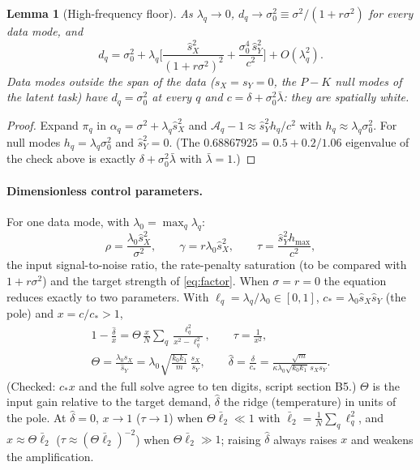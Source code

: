 \documentclass[11pt,a4paper]{article}
\newcommand{\sX}{\hat s_X^2}
\newcommand{\sY}{\hat s_Y^2}
\newcommand{\amp}{\mathcal A}
\newtheorem{lemma}{Lemma}
\theoremstyle{remark}
\begin{document}
\begin{lemma}[High-frequency floor]\label{lem:floor}
As $\lambda_q\to0$, $d_q \to \sigma_0^2 \equiv \sigma^2/(1+r\sigma^2)$ for every data mode, and
\begin{equation}
  d_q = \sigma_0^2 + \lambda_q\Big[\frac{\sX}{(1+r\sigma^2)^2} + \frac{\sigma_0^4\,\sY}{c^2}\Big] + O(\lambda_q^2).
\end{equation}
Data modes outside the span of the data ($s_X = s_Y = 0$, the $P-K$ \emph{null modes} of the latent task) have $d_q = \sigma_0^2$ at every $q$ and $c = \delta + \sigma_0^2\bar\lambda$: they are spatially white.
\end{lemma}
\begin{proof}
Expand $\pi_q$ in $\alpha_q = \sigma^2 + \lambda_q\sX$ and $\amp_q - 1 \approx \sY h_q/c^2$ with $h_q \approx \lambda_q\sigma_0^2$. For null modes $h_q = \lambda_q\sigma_0^2$ and $\sY = 0$. (The $0.68867925 = 0.5 + 0.2/1.06$ eigenvalue of the check above is exactly $\delta + \sigma_0^2\bar\lambda$ with $\bar\lambda = 1$.)
\end{proof}

\paragraph{Dimensionless control parameters.}
For one data mode, with $\lambda_0 = \max_q\lambda_q$:
\begin{equation}
  \rho = \frac{\lambda_0\sX}{\sigma^2},\qquad
  \gamma = r\lambda_0\sX,\qquad
  \tau = \frac{\sY h_{\max}}{c^2},
  \label{eq:knobs}
\end{equation}
the input signal-to-noise ratio, the rate-penalty saturation (to be compared with $1 + r\sigma^2$) and the target strength of \eqref{eq:factor}.
When $\sigma = r = 0$ the equation reduces exactly to two parameters. With $\ell_q = \lambda_q/\lambda_0\in[0,1]$, $c_* = \lambda_0\hat s_X\hat s_Y$ (the pole) and $x = c/c_* > 1$,
\begin{equation}
\begin{gathered}
  1 - \frac{\hat\delta}{x} = \Theta\,\frac xN\sum_q\frac{\ell_q^2}{x^2 - \ell_q^2},
  \qquad \tau = \frac1{x^2},\\
  \Theta = \frac{\lambda_0\hat s_X}{\hat s_Y} = \lambda_0\sqrt{\frac{k_0k_1}{m}}\,\frac{s_X}{s_Y},
  \qquad
  \hat\delta = \frac{\delta}{c_*} = \frac{\sqrt m}{\kappa\lambda_0\sqrt{k_0k_1}\,s_Xs_Y}.
\end{gathered}
  \label{eq:reduced}
\end{equation}
(Checked: $c_*x$ and the full solve agree to ten digits, script section B5.) $\Theta$ is the input gain relative to the target demand, $\hat\delta$ the ridge (temperature) in units of the pole. At $\hat\delta = 0$, $x\to1$ ($\tau\to1$) when $\Theta\bar\ell_2 \ll 1$ with $\bar\ell_2 = \frac1N\sum_q\ell_q^2$, and $x\approx\Theta\bar\ell_2$ ($\tau\approx(\Theta\bar\ell_2)^{-2}$) when $\Theta\bar\ell_2\gg1$; raising $\hat\delta$ always raises $x$ and weakens the amplification.
\end{document}
